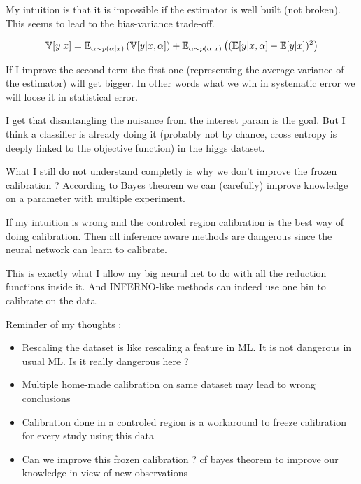 My intuition is that it is impossible if the estimator is well built (\ie not broken).
This seems to lead to the bias-variance trade-off.

$$
\mathbb{V}[y|x] = \mathbb{E}_{\alpha \sim p(\alpha|x)} \left (\mathbb{V}[y|x, \alpha] \right ) + \mathbb{E}_{\alpha \sim p(\alpha|x)} \left ( (\mathbb{E} [y|x, \alpha]  - \mathbb{E}[y|x])^2\right )
$$

If I improve the second term the first one (representing the average variance of the estimator) will get bigger.
In other words what we win in systematic error we will loose it in statistical error.

I get that disantangling the nuisance from the interest param is the goal. 
But I think a classifier is already doing it (probably not by chance, cross entropy is deeply linked to the objective function) in the higgs dataset.


What I still do not understand completly is why we don't improve the frozen calibration ?
According to Bayes theorem we can (carefully) improve knowledge on a parameter with multiple experiment.


If my intuition is wrong and the controled region calibration is the best way of doing calibration. 
Then all inference aware methods are dangerous since the neural network can learn to calibrate.

This is exactly what I allow my big neural net to do with all the reduction functions inside it.
And INFERNO-like methods can indeed use one bin to calibrate on the data.


Reminder of my thoughts :
\begin{itemize}
	\item Rescaling the dataset is like rescaling a feature in ML. It is not dangerous in usual ML. Is it really dangerous here ?
	\item Multiple home-made calibration on same dataset may lead to wrong conclusions
	\item Calibration done in a controled region is a workaround to freeze calibration for every study using this data
	\item Can we improve this frozen calibration ? cf bayes theorem to improve our knowledge in view of new observations
\end{itemize}


